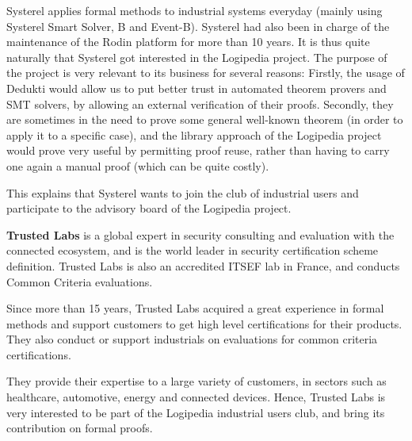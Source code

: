 Systerel applies formal methods to industrial systems everyday (mainly
using Systerel Smart Solver, B and Event-B). Systerel had also been in
charge of the maintenance of the Rodin platform for more than 10
years. It is thus quite naturally that Systerel got interested in the
Logipedia project. The purpose of the project is very relevant to its
business for several reasons: Firstly, the usage of Dedukti would
allow us to put better trust in automated theorem provers and SMT
solvers, by allowing an external verification of their
proofs. Secondly, they are sometimes in the need to prove some general
well-known theorem (in order to apply it to a specific case), and the
library approach of the Logipedia project would prove very useful by
permitting proof reuse, rather than having to carry one again a manual
proof (which can be quite costly).

This explains that Systerel wants to join the club of industrial users 
and participate to the advisory board of the Logipedia project.

{\bf Trusted Labs} is a global expert in security consulting and
evaluation with the connected ecosystem, and is the world leader in
security certification scheme definition. Trusted Labs is also an
accredited ITSEF lab in France, and conducts Common Criteria
evaluations.

Since more than 15 years, Trusted Labs acquired a great experience in
formal methods and support customers to get high level certifications
for their products. They also conduct or support industrials on
evaluations for common criteria certifications.

They provide their expertise to a large variety of customers, in
sectors such as healthcare, automotive, energy and connected
devices. Hence, Trusted Labs is very interested to be part of the
Logipedia industrial users club, and bring its contribution on formal
proofs.


